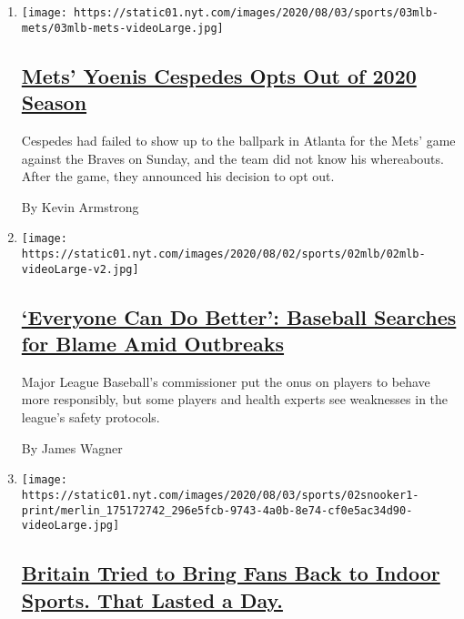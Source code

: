 \begin{enumerate}
\def\labelenumi{\arabic{enumi}.}
\item
  \texttt{[image: https://static01.nyt.com/images/2020/08/03/sports/03mlb-mets/03mlb-mets-videoLarge.jpg]}

  \hypertarget{mets-yoenis-cespedes-opts-out-of-2020-season}{%
  \subsection{\texorpdfstring{\href{/2020/08/02/sports/baseball/Yoenis-cespedes-opt-out-rule.html}{Mets'
  Yoenis Cespedes Opts Out of 2020
  Season}}{Mets' Yoenis Cespedes Opts Out of 2020 Season}}\label{mets-yoenis-cespedes-opts-out-of-2020-season}}

  Cespedes had failed to show up to the ballpark in Atlanta for the
  Mets' game against the Braves on Sunday, and the team did not know his
  whereabouts. After the game, they announced his decision to opt out.

  By Kevin Armstrong
\item
  \texttt{[image: https://static01.nyt.com/images/2020/08/02/sports/02mlb/02mlb-videoLarge-v2.jpg]}

  \hypertarget{everyone-can-do-better-baseball-searches-for-blame-amid-outbreaks}{%
  \subsection{\texorpdfstring{\href{/2020/08/02/sports/baseball/mlb-coronavirus-outbreaks.html}{`Everyone
  Can Do Better': Baseball Searches for Blame Amid
  Outbreaks}}{`Everyone Can Do Better': Baseball Searches for Blame Amid Outbreaks}}\label{everyone-can-do-better-baseball-searches-for-blame-amid-outbreaks}}

  Major League Baseball's commissioner put the onus on players to behave
  more responsibly, but some players and health experts see weaknesses
  in the league's safety protocols.

  By James Wagner
\item
  \texttt{[image: https://static01.nyt.com/images/2020/08/03/sports/02snooker1-print/merlin\_175172742\_296e5fcb-9743-4a0b-8e74-cf0e5ac34d90-videoLarge.jpg]}

  \hypertarget{britain-tried-to-bring-fans-back-to-indoor-sports-that-lasted-a-day}{%
  \subsection{\texorpdfstring{\href{/2020/08/02/sports/snooker-world-championship.html}{Britain
  Tried to Bring Fans Back to Indoor Sports. That Lasted a
  Day.}}{Britain Tried to Bring Fans Back to Indoor Sports. That Lasted a Day.}}\label{britain-tried-to-bring-fans-back-to-indoor-sports-that-lasted-a-day}}


\end{enumerate}
